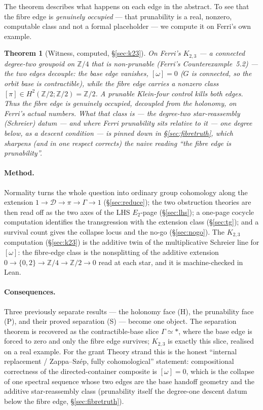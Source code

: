 \documentclass[11pt]{article}
\newtheorem{theorem}{Theorem}
\theoremstyle{definition}
\newcommand{\D}{\mathcal{D}}
\newcommand{\Z}{\mathbb{Z}}
\begin{document}
The theorem describes what happens on each edge in the abstract. To see that the fibre edge
is \emph{genuinely occupied} --- that prunability is a real, nonzero, computable class and
not a formal placeholder --- we compute it on Ferri's own example.

\begin{theorem}[Witness, computed, \S\ref{sec:k23}]\label{thm:main-witness}
On Ferri's $K_{2,3}$ \cite[Ex.~4.29]{ferri} --- a connected degree-two groupoid on
$\Z/4$ that is \emph{non-prunable} (Ferri's Counterexample~5.2) --- the two edges decouple:
the base edge vanishes, $[\omega]=0$ \textup{(}$G$ is connected, so the orbit base is
contractible\textup{)}, while the fibre edge carries a nonzero class
$[\pi]\in H^2(\Z/2;\Z/2)=\Z/2$. A prunable Klein-four control kills both edges. Thus the
fibre edge is genuinely occupied, decoupled from the holonomy, on Ferri's actual numbers. What
that class \emph{is} --- the degree-two star-reassembly (Schreier) datum --- and where Ferri
prunability sits relative to it --- one degree below, as a descent condition --- is pinned down in
\S\ref{sec:fibretruth}, which sharpens (and in one respect corrects) the naive reading ``the fibre
edge is prunability''.
\end{theorem}

\paragraph{Method.} Normality turns the whole question into ordinary group cohomology along
the extension $1\to\D\to\pi\to\Gamma\to1$ (\S\ref{sec:reduce}); the two obstruction theories
are then read off as the two axes of the LHS $E_2$-page (\S\ref{sec:lhs}); a one-page cocycle
computation identifies the transgression with the extension class (\S\ref{sec:tg}); and a
survival count gives the collapse locus and the no-go (\S\ref{sec:nogo}). The $K_{2,3}$
computation (\S\ref{sec:k23}) is the additive twin of the multiplicative Schreier line for
$[\omega]$: the fibre-edge class is the nonsplitting of the additive extension
$0\to\{0,2\}\to\Z/4\to\Z/2\to0$ read at each star, and it is machine-checked in Lean.

\paragraph{Consequences.} Three previously separate results --- the holonomy face (H), the
prunability face (P), and their proved separation (S) \cite{sep,sep2} --- become one object.
The separation theorem is recovered as the contractible-base slice $\Gamma\simeq\ast$, where
the base edge is forced to zero and only the fibre edge survives; $K_{2,3}$ is exactly this
slice, realised on a real example. For the grant Theory strand this is the honest
``internal replacement / Zappa--Sz\'ep, fully cohomological'' statement: compositional
correctness of the directed-container composite is $[\omega]=0$, which is the collapse of one
spectral sequence whose two edges are the base handoff geometry and the additive star-reassembly class (prunability itself the degree-one descent datum below the fibre edge, \S\ref{sec:fibretruth}).
\end{document}

